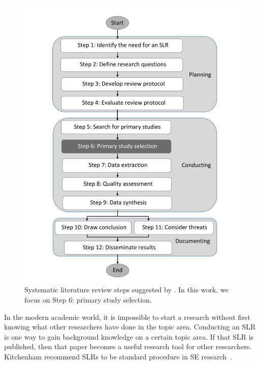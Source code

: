 \documentclass[final,twocolumn,5p]{elsarticle}
\theoremstyle{break}
\begin{document}
\begin{figure}[t]
    \centering
    \includegraphics[width=\linewidth]{procedure.pdf}
    \caption{Systematic literature review steps suggested by \cite{keele2007guidelines}. In this work, we focus on Step 6: primary study selection.}
    \label{fig: slr}
\end{figure}

In the modern academic world, it is
impossible to start a research without first knowing what other researchers have
done in the topic area. Conducting an SLR is one way to gain
background knowledge on a certain topic area.
If that SLR is published, then that paper becomes a useful research tool
for other researchers.  Kitchenham recommend SLRs to be standard
procedure in SE research~\cite{kitchenham2004evidence,keele2007guidelines}.
\end{document}
